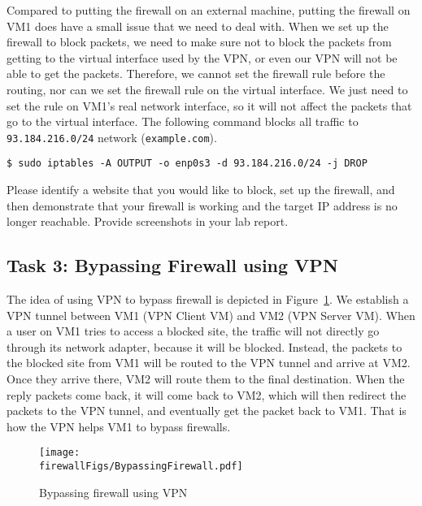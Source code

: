 Compared to putting the firewall on an external machine, putting the firewall on VM1 does have
a small issue that we need to deal with. When we set up the firewall to block packets, we need
to make sure not to block the packets from getting to the virtual interface used by the VPN, or even our
VPN will not be able to get the packets.  Therefore, we cannot set the firewall rule before the
routing, nor can we set the firewall rule on the virtual interface. We just need to set the
rule on VM1's real network interface, so it will not affect the packets that go to the virtual
interface. The following command blocks all traffic to \texttt{93.184.216.0/24} 
network (\texttt{example.com}). 

\begin{lstlisting}
$ sudo iptables -A OUTPUT -o enp0s3 -d 93.184.216.0/24 -j DROP
\end{lstlisting}

Please identify a website that you would like to block, set up the firewall,
and then demonstrate that your firewall is working and the target IP address is no longer 
reachable. Provide screenshots in your lab report.  


\subsection{Task 3: Bypassing Firewall using VPN}



The idea of using VPN to bypass firewall is depicted in 
Figure~\ref{vpn_firewall:fig:bypassing}. 
We establish a VPN tunnel between VM1 (VPN Client VM) 
and VM2 (VPN Server VM). 
When a user on VM1 tries to access a blocked site, the traffic will not directly 
go through its network adapter, because it will be blocked. Instead, the 
packets to the blocked site from VM1 will be routed to the VPN tunnel and arrive at VM2. Once
they arrive there, VM2 will route them to the final destination. 
When the reply packets come back, it will come back to VM2, which will then redirect the
packets to the VPN tunnel, and eventually get the packet back to VM1. That is how the VPN helps
VM1 to bypass firewalls. 

\begin{figure}[htb]
\begin{center}
\texttt{[image: \\firewallFigs/BypassingFirewall.pdf]}
\end{center}
\caption{Bypassing firewall using VPN}
\label{vpn_firewall:fig:bypassing}
\end{figure}
 


